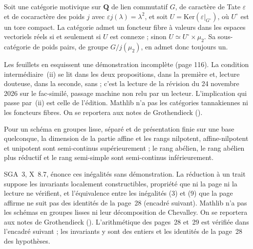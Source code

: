 \begin{encadre}
\begin{theoreme*}\nonverifie
Soit une catégorie motivique sur $\mathbf Q$ de lien commutatif $G$, de caractère de Tate $\varepsilon$ et de cocaractère des poids $j$ avec $\varepsilon j(\lambda) = \lambda^2$, et soit $U = \mathrm{Ker}(\varepsilon|_{G^\circ})$, où $U^\circ$ est un tore compact. La catégorie admet un foncteur fibre à valeurs dans les espaces vectoriels réels si et seulement si $U$ est connexe ; sinon $U \simeq U^\circ \times \mu_2$. Sa sous-catégorie de poids pairs, de groupe $G/j(\mu_2)$, en admet donc toujours un.
\end{theoreme*}
\end{encadre}
{\small Les feuillets en esquissent une démonstration incomplète (page 116). La condition intermédiaire~(ii) se lit dans les deux propositions,  dans la première et, lecture douteuse,  dans la seconde, sans  ; c'est la lecture de la révision du 24 novembre 2026 sur le fac-similé, passage machine non relu par un lecteur. L'implication qui passe par~(ii) est celle de l'édition. Mathlib n'a pas les catégories tannakiennes ni les foncteurs fibres. On se reportera aux notes de Grothendieck ().\par}

\begin{encadre}
\begin{theoreme*}\nonverifie
Pour un schéma en groupes lisse, séparé et de présentation finie sur une base quelconque, la dimension de la partie affine et les rangs nilpotent, affine-nilpotent et unipotent sont semi-continus supérieurement ; le rang abélien, le rang abélien plus réductif et le rang semi-simple sont semi-continus inférieurement.
\end{theoreme*}
\end{encadre}
{\small SGA~3, X~8.7, énonce ces inégalités sans démonstration. La réduction à un trait suppose les invariants localement constructibles, propriété que ni la page ni la lecture ne vérifient, et l'équivalence entre les inégalités (3) et (9) que la page affirme ne suit pas des identités de la page~28 (encadré suivant). Mathlib n'a pas les schémas en groupes lisses ni leur décomposition de Chevalley. On se reportera aux notes de Grothendieck (). L'arithmétique des pages~28 et~29 est vérifiée dans l'encadré suivant ; les invariants y sont des entiers et les identités de la page~28 des hypothèses.\par}

